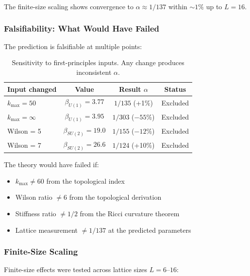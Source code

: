 The finite-size scaling shows convergence to $\alpha \approx 1/137$ within $\sim 1\%$ up to $L = 16$.

\subsubsection{Falsifiability: What Would Have Failed}

The prediction is falsifiable at multiple points:

\begin{table}[h]
\centering
\caption{Sensitivity to first-principles inputs. Any change produces inconsistent $\alpha$.}\label{tab:sensitivity}
\begin{ruledtabular}
\scriptsize
\begin{tabular}{lccc}
\textbf{Input changed} & \textbf{Value} & \textbf{Result $\alpha$} & \textbf{Status} \\
\hline
$k_{\max} = 50$ & $\beta_{U(1)} = 3.77$ & $1/135$ (+1\%) & Excluded \\
$k_{\max} = \infty$ & $\beta_{U(1)} = 3.95$ & $1/303$ ($-55$\%) & Excluded \\
Wilson = 5 & $\beta_{SU(2)} = 19.0$ & $1/155$ ($-12$\%) & Excluded \\
Wilson = 7 & $\beta_{SU(2)} = 26.6$ & $1/124$ (+10\%) & Excluded \\
\end{tabular}
\end{ruledtabular}
\end{table}

The theory would have failed if:
\begin{itemize}
\item $k_{\max} \neq 60$ from the topological index
\item Wilson ratio $\neq 6$ from the topological derivation
\item Stiffness ratio $\neq 1/2$ from the Ricci curvature theorem
\item Lattice measurement $\neq 1/137$ at the predicted parameters
\end{itemize}

\subsubsection{Finite-Size Scaling}

Finite-size effects were tested across lattice sizes $L = 6$--$16$:

